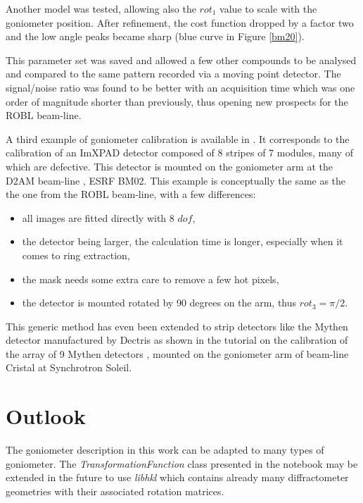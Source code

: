 \documentclass[preprint]{iucr}              %
\begin{document}
Another model was tested, allowing also the $rot_1$ value to scale with the 
goniometer position. 
After refinement, the cost function dropped by a factor two and
the low angle peaks became sharp (blue curve in Figure \ref{bm20}). 

This parameter set was saved and allowed a few other compounds to be analysed and
compared to the same pattern recorded via a moving point detector. 
The signal/noise ratio was found to be better with an acquisition time which was one order
of magnitude shorter than previously, thus opening new prospects for
the ROBL beam-line.

A third example of goniometer calibration is available in \cite{rotation_xpad}. 
It corresponds to the calibration of an ImXPAD detector \cite{BOUDET200341}
composed of 8 stripes of 7 modules, many of which are defective.
This detector is mounted on the goniometer arm at the D2AM beam-line
\cite{Ferrer:ri0008}, ESRF BM02. 
This example is conceptually the same as the the one from the ROBL beam-line,
with a few differences:
\begin{itemize}
  \item all images are fitted directly with 8 $dof$,
  \item the detector being larger, the calculation time is
        longer, especially when it comes to ring extraction,
  \item the mask needs some extra care to remove a few hot pixels,
  \item the detector is mounted rotated by 90 degrees on the arm, thus $rot_3=\pi/2$.
\end{itemize}

This generic method has even been extended to strip detectors 
like the Mythen detector manufactured by Dectris as shown in the tutorial on the 
calibration of the array of 9 Mythen detectors \cite{rotation_mythen}, mounted on 
the goniometer arm of beam-line Cristal at Synchrotron Soleil.  

\section{Outlook}

The goniometer description in this work can be adapted to
many types of goniometer.
The \textit{TransformationFunction} class presented in the notebook may be extended
in the future to use \textit{libhkl} \cite{libhkl} which contains already many
diffractometer geometries with their associated rotation matrices. 
\end{document}
